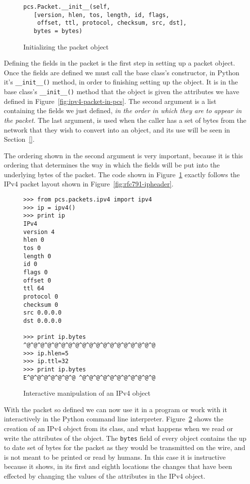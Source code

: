 \documentclass{sig-alternate-10pt}
\begin{document}
\begin{figure}
  \centering
\begin{verbatim}
pcs.Packet.__init__(self,
   [version, hlen, tos, length, id, flags, 
    offset, ttl, protocol, checksum, src, dst],
   bytes = bytes)
\end{verbatim}
  \caption{Initializing the packet object}
  \label{fig:initializing-the-packet-object}
\end{figure}

Defining the fields in the packet is the first step in setting up a
packet object.  Once the fields are defined we must call the base
class's constructor, in Python it's \verb|__init__()| method, in order
to finishing setting up the object.  It is in the base class's
\verb|__init__()| method that the object is given the attributes we
have defined in Figure~\ref{fig:ipv4-packet-in-pcs}.  The second
argument is a list containing the fields we just defined, \emph{in the order
in which they are to appear in the packet.}  The last argument,
 is used when the caller has a set of bytes from the
network that they wish to convert into an object, and its use will be
seen in Section~\ref{}.  

The ordering shown in the second argument is very important, because
it is this ordering that determines the way in which the fields will
be put into the underlying bytes of the packet.  The code shown in
Figure~\ref{fig:initializing-the-packet-object} exactly follows the
IPv4 packet layout shown in Figure~\ref{fig:rfc791-ipheader}.

\begin{figure}
  \centering
\begin{verbatim}
>>> from pcs.packets.ipv4 import ipv4
>>> ip = ipv4()
>>> print ip
IPv4
version 4
hlen 0
tos 0
length 0
id 0
flags 0
offset 0
ttl 64
protocol 0
checksum 0
src 0.0.0.0
dst 0.0.0.0

>>> print ip.bytes
^@^@^@^@^@^@^@^@^@^@^@^@^@^@^@^@^@^@^@
>>> ip.hlen=5
>>> ip.ttl=32
>>> print ip.bytes
E^@^@^@^@^@^@^@ ^@^@^@^@^@^@^@^@^@^@^@
\end{verbatim}
  \caption{Interactive manipulation of an IPv4 object}
  \label{fig:interactive-manipulation-of-an-ipv4-object}
\end{figure}

With the packet so defined we can now use it in a program or work with
it interactively in the Python command line interpreter.
Figure~\ref{fig:interactive-manipulation-of-an-ipv4-object} shows the
creation of an IPv4 object from its class, and what happens when we
read or write the attributes of the object.  The \verb|bytes| field of
every  object contains the up to date set of bytes for
the packet as they would be transmitted on the wire, and is not meant
to be printed or read by humans.  In this case it is instructive
because it shows, in its first and eighth locations the changes that
have been effected by changing the values of the attributes in the
IPv4 object.
\end{document}
